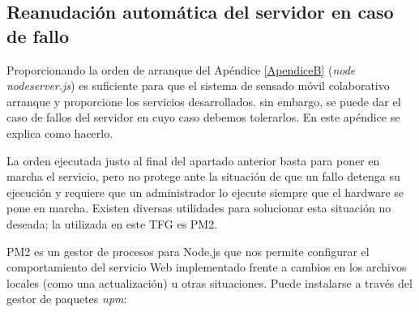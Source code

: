 \begin{appendices}


\cleardoublepage
{}%
\begin{center}
\begin{minipage}{.75\textwidth}

\section{Reanudación automática del servidor en caso de fallo}\label{ApendiceC}

Proporcionando la orden de arranque del Apéndice \ref{ApendiceB} (\emph{node nodeserver.js}) es suficiente para que el sistema de sensado móvil colaborativo arranque y proporcione los servicios desarrollados. sin embargo, se puede dar el caso de fallos del servidor en cuyo caso debemos tolerarlos. En este apéndice se explica como hacerlo.
\end{minipage}
\end{center}
\clearpage%

La orden ejecutada justo al final del apartado anterior basta para poner en marcha el servicio, pero no protege ante la situación de que un fallo detenga su ejecución y requiere que un administrador lo ejecute siempre que el hardware se pone en marcha. Existen diversas utilidades para solucionar esta situación no deseada; la utilizada en este TFG es PM2.

PM2 es un gestor de procesos para Node.js que nos permite configurar el comportamiento del servicio Web implementado frente a cambios en los archivos locales (como una actualización) u otras situaciones. Puede instalarse a través del gestor de paquetes \emph{npm}:



\end{appendices}
